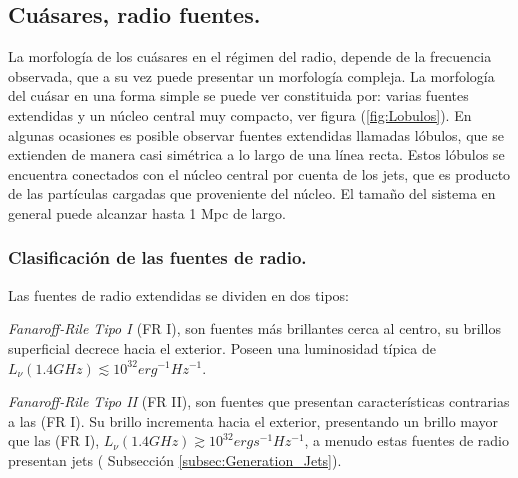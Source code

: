 	\subsection{Cuásares, radio fuentes.}
	\label{subsec:}

La morfología de los cuásares en el régimen del radio, depende de la frecuencia observada, que a su vez puede presentar un morfología compleja. La morfología del cuásar en una forma simple se puede ver  constituida por: varias fuentes extendidas y un núcleo central muy compacto, ver figura (\ref{fig:Lobulos}). En algunas ocasiones es posible observar fuentes extendidas llamadas lóbulos, que se extienden de manera casi simétrica a lo largo de una línea recta. Estos lóbulos se encuentra conectados con el núcleo central por cuenta de los jets, que es producto de las partículas cargadas que proveniente del núcleo. El tamaño del sistema en general puede alcanzar hasta 1 Mpc de largo. %

	\subsubsection{Clasificación de las fuentes de radio.}
	\label{subsubsec: clasification_source_radio}

Las fuentes de radio extendidas se dividen en dos tipos:

{\it{Fanaroff-Rile Tipo I }} (FR I), son fuentes más brillantes cerca al centro, su brillos superficial decrece hacia el exterior. Poseen una luminosidad típica de $L_{\nu}(1.4GHz)\lesssim 10^{32} erg^{-1} Hz^{-1}$.

{\it{Fanaroff-Rile Tipo II}} (FR II), son fuentes que presentan características contrarias a las (FR I). Su brillo incrementa hacia el exterior, presentando un brillo mayor que las (FR I), $L_{\nu}(1.4GHz)\gtrsim 10^{32} ergs^{-1}Hz^{-1}$, a menudo estas fuentes de radio presentan jets ( Subsección \ref{subsec:Generation_Jets}).



